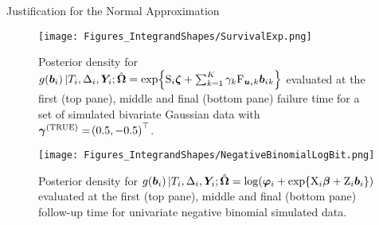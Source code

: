 \begin{chapter}{\label{cha:justification}Justification for the Normal Approximation}
  \begin{figure}[t]
      \centering
      \texttt{[image: Figures\_IntegrandShapes/SurvivalExp.png]}
      \caption{Posterior density for $g\!\left(\bm{b}_i\right)|T_i,\Delta_i,\bm{Y}_i;\hat{\bm{\Omega}}=\exp\!\left\{\mathrm{S}_i\bm{\zeta}+\sum_{k=1}^K\gamma_k\mathrm{F}_{\bm{u}_ik}\bm{b}_i{_k}\right\}$ evaluated at the first (top pane), middle and final (bottom pane) failure time for a set of simulated bivariate Gaussian data with $\bm{\gamma}^{(\mathrm{TRUE})}=\!\left(0.5,-0.5\right)^\top$.}
      \label{fig:justification-integrands-survival}
  \end{figure}

  \begin{figure}[t]
      \centering
      \texttt{[image: Figures\_IntegrandShapes/NegativeBinomialLogBit.png]}
      \caption{Posterior density for $g\!\left(\bm{b}_i\right)|T_i,\Delta_i,\bm{Y}_i;\hat{\bm{\Omega}}=\log\!\left(\bm{\varphi}_i+\exp\!\left\{\mathrm{X}_i\bm{\beta}+\mathrm{Z}_i\bm{b}_i\right\}\right)$ evaluated at the first (top pane), middle and final (bottom pane) follow-up time for univariate negative binomial simulated data.}
      \label{fig:justification-integrands-negbinquantity}
  \end{figure}


\end{chapter}
